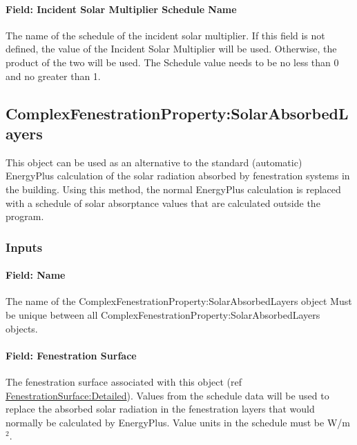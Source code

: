 \paragraph{Field: Incident Solar Multiplier Schedule Name}\label{field-shading-multiplier-schedule-name-IncidentSolarMultiplier}

The name of the schedule of the incident solar multiplier. If this field is not
defined, the value of the Incident Solar Multiplier will be used. Otherwise, the
product of the two will be used. The Schedule value needs to be no less than 0
and no greater than 1.

\subsection{ComplexFenestrationProperty:SolarAbsorbedLayers}\label{complexfenestrationpropertysolarabsorbedlayers}

This object can be used as an alternative to the standard (automatic) EnergyPlus calculation of the solar radiation absorbed by fenestration systems in the building. Using this method, the normal EnergyPlus calculation is replaced with a schedule of solar absorptance values that are calculated outside the program.

\subsubsection{Inputs}\label{inputs-15}

\paragraph{Field: Name}\label{field-name-11}

The name of the ComplexFenestrationProperty:SolarAbsorbedLayers object Must be unique between all ComplexFenestrationProperty:SolarAbsorbedLayers objects.

\paragraph{Field: Fenestration Surface}\label{field-fenestration-surface}

The fenestration surface associated with this object (ref \hyperref[fenestrationsurfacedetailed]{FenestrationSurface:Detailed}). Values from the schedule data will be used to replace the absorbed solar radiation in the fenestration layers that would normally be calculated by EnergyPlus. Value units in the schedule must be W/m\(^{2}\).

